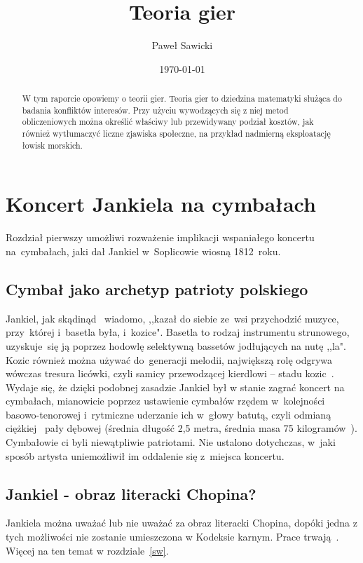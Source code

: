 \documentclass[11pt, onecolumn, twoside]{report}
\title{Teoria gier}
\author{Paweł Sawicki}
\date{\today}
\begin{document}
\pagestyle{fancy}
\fancyfoot[C]{}
\fancyfoot[R]{\thepage}
\fancyhead[L]{}
\fancyhead[R]{}

\begin{titlepage}
\maketitle
\end{titlepage}

\newpage
\begin{abstract}
W tym raporcie opowiemy o teorii gier. Teoria gier to dziedzina matematyki służąca do badania konfliktów interesów. Przy użyciu wywodzących się z niej metod obliczeniowych można określić właściwy lub przewidywany podział kosztów, jak również wytłumaczyć liczne zjawiska społeczne, na przykład nadmierną eksploatację łowisk morskich.
\end{abstract}
\tableofcontents
\newpage
\chapter{Koncert Jankiela na cymbałach}
Rozdział pierwszy umożliwi rozważenie implikacji wspaniałego koncertu na~cymbałach, jaki dał Jankiel w~Soplicowie wiosną 1812~roku.
\newpage
\section{Cymbał jako archetyp patrioty polskiego}
Jankiel, jak skądinąd~\cite{bibosz1} wiadomo, ,,kazał do siebie ze~wsi przychodzić muzyce, przy~której i~basetla była, i~kozice". Basetla to rodzaj instrumentu strunowego, uzyskuje~się ją poprzez hodowlę selektywną bassetów jodłujących na nutę ,,la". Kozic również można używać do~generacji melodii, największą rolę odgrywa wówczas tresura licówki, czyli samicy przewodzącej kierdlowi -- stadu kozic~\cite{bibosz3}. Wydaje się, że dzięki podobnej zasadzie Jankiel był w stanie zagrać koncert na cymbałach, mianowicie poprzez ustawienie cymbałów rzędem w~kolejności basowo-tenorowej i~rytmiczne uderzanie ich w~głowy batutą, czyli odmianą ciężkiej~\cite{bibosz2} pały dębowej (średnia długość 2,5 metra, średnia masa 75 kilogramów~\cite{bibosz1}). Cymbałowie ci byli niewątpliwie patriotami. Nie ustalono dotychczas, w~jaki sposób artysta uniemożliwił im oddalenie się z~miejsca koncertu.
\newpage
\section{Jankiel - obraz literacki Chopina?}
Jankiela można uważać lub nie uważać za obraz literacki Chopina, dopóki jedna z tych możliwości nie zostanie umieszczona w Kodeksie karnym. Prace trwają~\cite{bibosz2}. Więcej na ten temat w rozdziale~\ref{sw}.
\newpage
\end{document}
